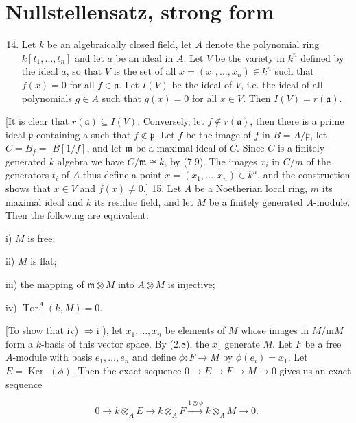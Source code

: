 \documentclass{standalone}
\theoremstyle{definition}
\theoremstyle{remark}
\begin{document}
\section{Nullstellensatz, strong form}
\begin{enumerate}
  \setcounter{enumi}{13}
  \item Let $k$ be an algebraically closed field, let $A$ denote the polynomial ring $k\left[t_{1}, \ldots, t_{n}\right]$ and let $a$ be an ideal in $A$. Let $V$ be the variety in $k^{n}$ defined by the ideal $a$, so that $V$ is the set of all $x=\left(x_{1}, \ldots, x_{n}\right) \in k^{n}$ such that $f(x)=0$ for all $f \in \mathfrak{a}$. Let $I(V)$ be the ideal of $V$, i.e. the ideal of all polynomials $g \in A$ such that $g(x)=0$ for all $x \in V$. Then $I(V)=r(\mathfrak{a})$.
\end{enumerate}

[It is clear that $r(\mathfrak{a}) \subseteq I(V)$. Conversely, let $f \notin r(\mathfrak{a})$, then there is a prime ideal $\mathfrak{p}$ containing a such that $f \notin \mathfrak{p}$. Let $f$ be the image of $f$ in $B=A / \mathfrak{p}$, let $C=B_{f}=$ $B[1 / f]$, and let $\mathfrak{m}$ be a maximal ideal of $C$. Since $C$ is a finitely generated $k$ algebra we have $C / \mathfrak{m} \cong k$, by (7.9). The images $x_{i}$ in $C / m$ of the generators $t_{i}$ of $A$ thus define a point $x=\left(x_{1}, \ldots, x_{n}\right) \in k^{n}$, and the construction shows that $x \in V$ and $f(x) \neq 0$.] 15. Let $A$ be a Noetherian local ring, $m$ its maximal ideal and $k$ its residue field, and let $M$ be a finitely generated $A$-module. Then the following are equivalent:

i) $M$ is free;

ii) $M$ is flat;

iii) the mapping of $\mathfrak{m} \otimes M$ into $A \otimes M$ is injective;

iv) $\operatorname{Tor}_{1}^{A}(k, M)=0$.

[To show that iv) $\Rightarrow \mathrm{i}$ ), let $x_{1}, \ldots, x_{n}$ be elements of $M$ whose images in $M / \mathrm{m} M$ form a $k$-basis of this vector space. By (2.8), the $x_{1}$ generate $M$. Let $F$ be a free $A$-module with basis $e_{1}, \ldots, e_{n}$ and define $\phi: F \rightarrow M$ by $\phi\left(e_{i}\right)=x_{1}$. Let $E=\operatorname{Ker}$ $(\phi)$. Then the exact sequence $0 \rightarrow E \rightarrow F \rightarrow M \rightarrow 0$ gives us an exact sequence

\[
0 \longrightarrow k \otimes_{A} E \longrightarrow k \otimes_{A} F \stackrel{1 \otimes \phi}{\longrightarrow} k \otimes_{A} M \longrightarrow 0 \text {. }
\]
\end{document}
